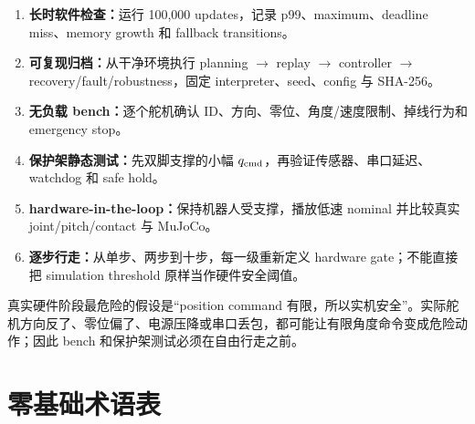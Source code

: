 \documentclass[UTF8,11pt,a4paper]{ctexart}
\begin{document}
\begin{enumerate}
 \item \textbf{长时软件检查：}运行 100,000 updates，记录 p99、maximum、deadline miss、memory growth 和 fallback transitions。
 \item \textbf{可复现归档：}从干净环境执行 planning $\rightarrow$ replay $\rightarrow$ controller $\rightarrow$ recovery/fault/robustness，固定 interpreter、seed、config 与 SHA-256。
 \item \textbf{无负载 bench：}逐个舵机确认 ID、方向、零位、角度/速度限制、掉线行为和 emergency stop。
 \item \textbf{保护架静态测试：}先双脚支撑的小幅 $q_{\rm cmd}$，再验证传感器、串口延迟、watchdog 和 safe hold。
 \item \textbf{hardware-in-the-loop：}保持机器人受支撑，播放低速 nominal 并比较真实 joint/pitch/contact 与 MuJoCo。
 \item \textbf{逐步行走：}从单步、两步到十步，每一级重新定义 hardware gate；不能直接把 simulation threshold 原样当作硬件安全阈值。
\end{enumerate}

\begin{warningbox}
真实硬件阶段最危险的假设是“position command 有限，所以实机安全”。实际舵机方向反了、零位偏了、电源压降或串口丢包，都可能让有限角度命令变成危险动作；因此 bench 和保护架测试必须在自由行走之前。
\end{warningbox}

\section{零基础术语表}\label{sec:glossary}
\end{document}
